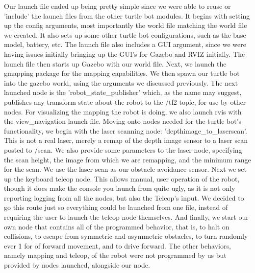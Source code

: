 \documentclass[12pt]{article}
\begin{document}
Our launch file ended up being pretty simple since we were able to reuse or 'include' the launch files from the other turtle bot modules. It begins with setting up the config arguments, most importantly the world file matching the world file we created. It also sets up some other turtle bot configurations, such as the base model, battery, etc. The launch file also includes a GUI argument, since we were having issues initially bringing up the GUI's for Gazebo and RVIZ initially. The launch file then starts up Gazebo with our world file. Next, we launch the gmapping package for the mapping capabilities. We then spawn our turtle bot into the gazebo world, using the arguments we discussed previously. The next launched node is the 'robot\_state\_publisher' which, as the name may suggest, publishes any transform state about the robot to the /tf2 topic, for use by other nodes. For visualizing the mapping the robot is doing, we also launch rvis with the view\_navigation launch file. Moving onto nodes needed for the turtle bot's functionality, we begin with the laser scanning node: 'depthimage\_to\_laserscan'. This is not a real laser, merely a remap of the depth image sensor to a laser scan posted to /scan. We also provide some parameters to the laser node, specifying the scan height, the image from which we are remapping, and the minimum range for the scan. We use the laser scan as our obstacle avoidance sensor. Next we set up the keyboard teleop node. This allows manual, user operation of the robot, though it does make the console you launch from quite ugly, as it is not only reporting logging from all the nodes, but also the Teleop's input. We decided to go this route just so everything could be launched from one file, instead of requiring the user to launch the teleop node themselves. And finally, we start our own node that contains all of the programmed behavior, that is, to halt on collisions, to escape from symmetric and asymmetric obstacles, to turn randomly ever 1 for of forward movement, and to drive forward. The other behaviors, namely mapping and teleop, of the robot were not programmed by us but provided by nodes launched, alongside our node.
\end{document}
